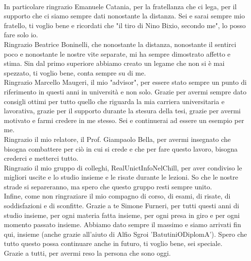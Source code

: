 \\In particolare ringrazio Emanuele Catania, per la fratellanza che ci lega, per il supporto che ci siamo sempre dati nonostante la distanza. Sei e sarai sempre mio fratello, ti voglio bene e ricordati che "il tiro di Nino Bixio, secondo me", lo posso fare solo io.
\\Ringrazio Beatrice Boninelli, che nonostante la distanza, nonostante il sentirci poco e nonostante le nostre vite separate, mi ha sempre dimostrato affetto e stima. Sin dal primo superiore abbiamo creato un legame che non si è mai spezzato, ti voglio bene, conta sempre su di me.
\\Ringrazio Marcello Maugeri, il mio "advisor", per essere stato sempre un punto di riferimento in questi anni in università e non solo. Grazie per avermi sempre dato consigli ottimi per tutto quello che riguarda la mia carriera universitaria e lavorativa, grazie per il supporto durante la stesura della tesi, grazie per avermi motivato e farmi credere in me stesso. Sei e continuerai ad essere un esempio per me.
\\Ringrazio il mio relatore, il Prof. Giampaolo Bella, per avermi insegnato che bisogna combattere per ciò in cui si crede e che per fare questo lavoro, bisogna crederci e metterci tutto.
\\Ringrazio il mio gruppo di colleghi, RealUnictInfoNelChill, per aver condiviso le migliori uscite e lo studio insieme e le risate durante le lezioni. So che le nostre strade si separeranno, ma spero che questo gruppo resti sempre unito.
\\Infine, come non ringraziare il mio compagno di corso, di esami, di risate, di soddisfazioni e di sconfitte. Grazie a te Simone Furneri, per tutti questi anni di studio insieme, per ogni materia fatta insieme, per ogni presa in giro e per ogni momento passato insieme. Abbiamo dato sempre il massimo e siamo arrivati fin qui, insieme (anche grazie all'aiuto di Alfio Sgroi 'BatutiniODiplomA'). Spero che tutto questo possa continuare anche in futuro, ti voglio bene, sei speciale.
\\Grazie a tutti, per avermi reso la persona che sono oggi.